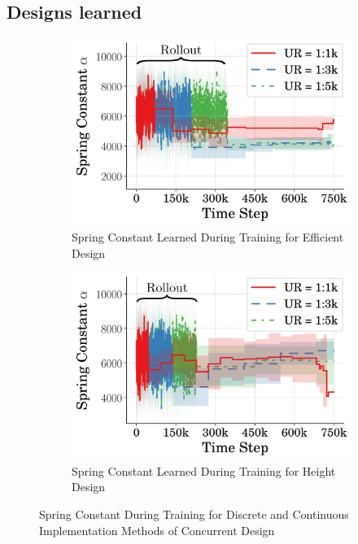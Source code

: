 \subsection{Designs learned}
%  
\begin{figure}[tb!]
  \centering
  \begin{subfigure}{.49\textwidth}
          \centering
          \includegraphics[width=\textwidth]{figures/Ch5/comp_update_rate/avg_eff_spring_.png}  
          \caption{Spring Constant Learned During Training for Efficient Design}
          \label{fig:comp_ur_spring_eff}
  \end{subfigure}%
  \hfill
  \begin{subfigure}{.49\textwidth}
          \centering
          \includegraphics[width=\textwidth]{figures/Ch5/comp_update_rate/avg_hei_spring_.png}  
          \caption{Spring Constant Learned During Training for Height Design}
          \label{fig:comp_ur_spring_high}
  \end{subfigure}
   \caption{Spring Constant During Training for Discrete and Continuous Implementation Methods of Concurrent Design}
   \label{fig:comp_ur_spring}
\end{figure}
